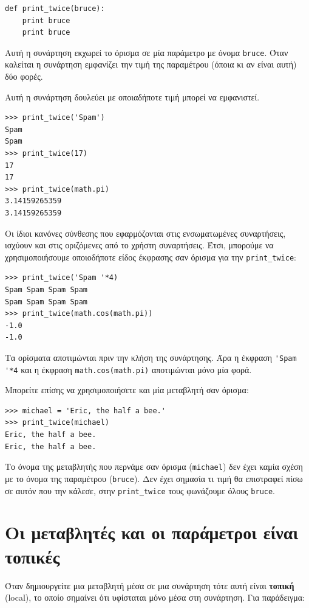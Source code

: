 \documentclass[10pt]{book}
\begin{document}
\begin{verbatim}
def print_twice(bruce):
    print bruce
    print bruce
\end{verbatim}
%

Αυτή η συνάρτηση εκχωρεί το όρισμα σε μία παράμετρο με όνομα {\tt bruce}.
Όταν καλείται η συνάρτηση εμφανίζει την τιμή της παραμέτρου (όποια κι αν είναι αυτή) δύο φορές.

Αυτή η συνάρτηση δουλεύει με οποιαδήποτε τιμή μπορεί να εμφανιστεί.


\begin{verbatim}
>>> print_twice('Spam')
Spam
Spam
>>> print_twice(17)
17
17
>>> print_twice(math.pi)
3.14159265359
3.14159265359
\end{verbatim}
%

Οι ίδιοι κανόνες σύνθεσης που εφαρμόζονται στις ενσωματωμένες συναρτήσεις,
ισχύουν και στις οριζόμενες από το χρήστη συναρτήσεις. Έτσι, μπορούμε να χρησιμοποιήσουμε οποιοδήποτε είδος έκφρασης σαν όρισμα για την \verb"print_twice":

\begin{verbatim}
>>> print_twice('Spam '*4)
Spam Spam Spam Spam
Spam Spam Spam Spam
>>> print_twice(math.cos(math.pi))
-1.0
-1.0
\end{verbatim}
%

Τα ορίσματα αποτιμώνται πριν την κλήση της συνάρτησης. Άρα η έκφραση 
\verb"'Spam '*4" και η έκφραση {\tt math.cos(math.pi)} αποτιμώνται μόνο μία φορά.

Μπορείτε επίσης να χρησιμοποιήσετε και μία μεταβλητή σαν όρισμα:


\begin{verbatim}
>>> michael = 'Eric, the half a bee.'
>>> print_twice(michael)
Eric, the half a bee.
Eric, the half a bee.
\end{verbatim}
%

Το όνομα της μεταβλητής που περνάμε σαν όρισμα ({\tt michael}) 
δεν έχει καμία σχέση με το όνομα της παραμέτρου ({\tt bruce}). 
Δεν έχει σημασία τι τιμή θα επιστραφεί πίσω σε αυτόν που την κάλεσε,
στην \verb"print_twice" τους φωνάζουμε όλους {\tt bruce}.



\section{Οι μεταβλητές και οι παράμετροι είναι τοπικές}

Όταν δημιουργείτε μια μεταβλητή μέσα σε μια συνάρτηση τότε αυτή είναι {\bf τοπική} (local), το οποίο σημαίνει ότι υφίσταται μόνο μέσα στη συνάρτηση. Για παράδειγμα:
\end{document}
